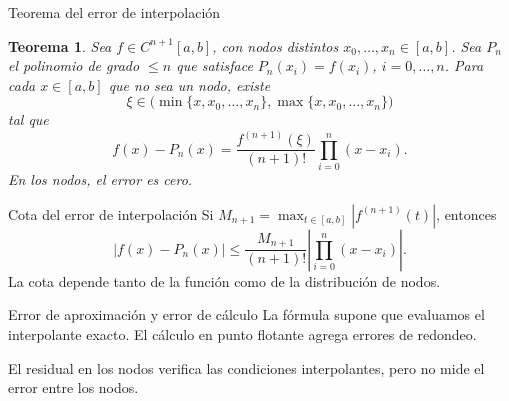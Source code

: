 \documentclass[aspectratio=169,12pt]{beamer}
\newtheorem{thm}{Teorema}
\theoremstyle{remark}
\begin{document}
\begin{frame}{Teorema del error de interpolación}
\begin{thm}
Sea $f\in C^{n+1}[a,b]$, con nodos distintos $x_0,\dots,x_n\in[a,b]$.
Sea $P_n$ el polinomio de grado $\leq n$ que satisface
$P_n(x_i)=f(x_i)$, $i=0,\dots,n$.
Para cada $x\in[a,b]$ que no sea un nodo, existe
\[
\xi\in\bigl(\min\{x,x_0,\dots,x_n\},
                 \max\{x,x_0,\dots,x_n\}\bigr)
\]
tal que
\[
f(x)-P_n(x)=\frac{f^{(n+1)}(\xi)}{(n+1)!}
                  \prod_{i=0}^n(x-x_i).
\]
En los nodos, el error es cero.
\end{thm}
\end{frame}

\begin{frame}{Cota del error de interpolación}
Si $M_{n+1}=\max_{t\in[a,b]}|f^{(n+1)}(t)|$, entonces
\[
|f(x)-P_n(x)|\leq\frac{M_{n+1}}{(n+1)!}
                       \left|\prod_{i=0}^n(x-x_i)\right|.
\]
La cota depende tanto de la función como de la distribución de nodos.
\begin{block}{Error de aproximación y error de cálculo}
La fórmula supone que evaluamos el interpolante exacto.
El cálculo en punto flotante agrega errores de redondeo.
\end{block}
El residual en los nodos verifica las condiciones interpolantes,
pero no mide el error entre los nodos.
\end{frame}


\end{document}
